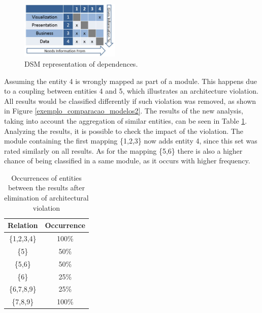 \documentclass{sig-alternate-05-2015}
\begin{document}
 \begin{figure}[!h]
 	\centering
 	\includegraphics[width=0.42\textwidth]{3_exemploMatrizViolada_en}
 	\caption{DSM representation	of dependences.}
 	\label{3_exemploMatrizViolada}
 \end{figure}
 
 Assuming the entity 4 is wrongly mapped as part of a module. This happens due to a coupling between entities 4 and 5, which illustrates an architecture violation. All results would be classified differently if such violation was removed, as shown in Figure \ref{exemplo_comparacao_modelos2}. The results of the new analysis, taking into account the aggregation of similar entities, can be seen in Table \ref{ocorrencias_2}. Analyzing the results, it is possible to check the impact of the violation. The module containing the first mapping \{1,2,3\} now adds  entity 4, since this set was rated similarly on all results. As for the mapping \{5,6\} there is also a higher chance of being classified in a same module, as it occurs with higher frequency.


\begin{table}[]
	\centering
	\caption{Occurrences of entities between the results after elimination of architectural violation}
	\label{ocorrencias_2}
	\begin{tabular}{|cc|}
		\hline
		\multicolumn{1}{|l}{Relation} & \multicolumn{1}{l|}{Occurrence} \\ \hline
		\{1,2,3,4\}                   	  & 100\%                           \\
		\{5\}                			  & 50\%                            \\
		\{5,6\}                    		  & 50\%                            \\
		\{6\}                 			  & 25\%                            \\
		\{6,7,8,9\}                       & 25\%                            \\
		\{7,8,9\}                         & 100\%                            \\ \hline
	\end{tabular}
\end{table}
\end{document}
